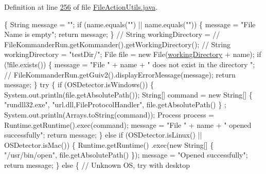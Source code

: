 Definition at line \hyperlink{L256}{256} of file \hyperlink{}{File\-Action\-Utils.\-java}.


\begin{DoxyCode}
                                           \{
        String message = \textcolor{stringliteral}{""};
        \textcolor{keywordflow}{if} (name.equals(\textcolor{stringliteral}{""}) || name.equals(\textcolor{stringliteral}{""})) \{
            message = \textcolor{stringliteral}{"File Name is empty"};
            \textcolor{keywordflow}{return} message;
        \}
        \textcolor{comment}{// String workingDirectory =}
        \textcolor{comment}{// FileKommanderRun.getKommander().getWorkingDirectory();}
        \textcolor{comment}{// String workingDirectory = "testDir/";}
        File file = \textcolor{keyword}{new} File(\hyperlink{classcom_1_1poly_1_1nlp_1_1filekommander_1_1file_1_1actions_1_1_file_action_utils_ad54a8fdc9145d2f423c54cb1597f874a}{workingDirectory} + name);
        \textcolor{keywordflow}{if} (!file.exists()) \{
            message = \textcolor{stringliteral}{"File "} + name + \textcolor{stringliteral}{" does not exist in the directory "};
            \textcolor{comment}{// FileKommanderRun.getGuiv2().displayErrorMessage(message);}
            \textcolor{keywordflow}{return} message;
        \}
        \textcolor{keywordflow}{try} \{
            \textcolor{keywordflow}{if} (OSDetector.isWindows()) \{
                System.out.println(file.getAbsolutePath());
                String[] command = \textcolor{keyword}{new} String[] \{ \textcolor{stringliteral}{"rundll32.exe"},
                        \textcolor{stringliteral}{"url.dll,FileProtocolHandler"}, file.getAbsolutePath() \}
      ;
                System.out.println(Arrays.toString(command));
                Process process = Runtime.getRuntime().exec(command);
                message = \textcolor{stringliteral}{"File "} + name + \textcolor{stringliteral}{" opened successfully"};
                \textcolor{keywordflow}{return} message;
            \} \textcolor{keywordflow}{else} \textcolor{keywordflow}{if} (OSDetector.isLinux() || OSDetector.isMac()) \{
                Runtime.getRuntime()
                        .exec(\textcolor{keyword}{new} String[] \{ \textcolor{stringliteral}{"/usr/bin/open"},
                                file.getAbsolutePath() \});
                message = \textcolor{stringliteral}{"Opened successfully"};
                \textcolor{keywordflow}{return} message;
            \} \textcolor{keywordflow}{else} \{
                \textcolor{comment}{// Unknown OS, try with desktop}

\end{DoxyCode}
